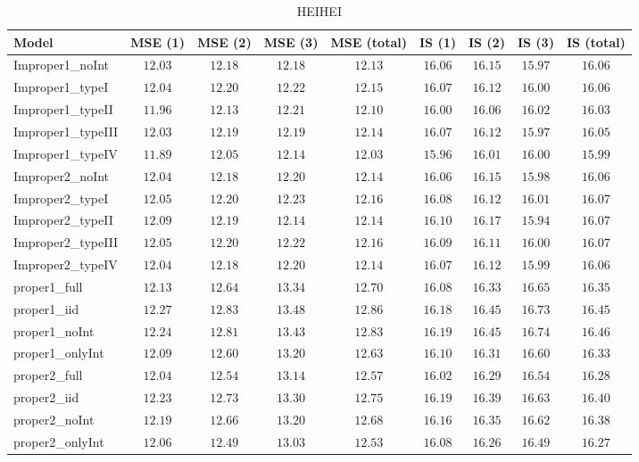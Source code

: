 \begin{table}

\caption{\label{tab:model-choice-sc6}HEIHEI}
\centering
\begin{tabular}{lcccccccc}
\hline
Model  & MSE (1) & MSE (2) & MSE (3) & MSE (total) & IS (1) & IS (2) & IS (3) & \multicolumn{1}{c}{IS (total)} \\ 
\hline
Improper1_noInt  & $12.03$ & $12.18$ & $12.18$ & $12.13$ & $16.06$ & $16.15$ & $15.97$ & $16.06$ \\
Improper1_typeI  & $12.04$ & $12.20$ & $12.22$ & $12.15$ & $16.07$ & $16.12$ & $16.00$ & $16.06$ \\
Improper1_typeII  & $11.96$ & $12.13$ & $12.21$ & $12.10$ & $16.00$ & $16.06$ & $16.02$ & $16.03$ \\
Improper1_typeIII  & $12.03$ & $12.19$ & $12.19$ & $12.14$ & $16.07$ & $16.12$ & $15.97$ & $16.05$ \\
Improper1_typeIV  & $11.89$ & $12.05$ & $12.14$ & $12.03$ & $15.96$ & $16.01$ & $16.00$ & $15.99$ \\
Improper2_noInt  & $12.04$ & $12.18$ & $12.20$ & $12.14$ & $16.06$ & $16.15$ & $15.98$ & $16.06$ \\
Improper2_typeI  & $12.05$ & $12.20$ & $12.23$ & $12.16$ & $16.08$ & $16.12$ & $16.01$ & $16.07$ \\
Improper2_typeII  & $12.09$ & $12.19$ & $12.14$ & $12.14$ & $16.10$ & $16.17$ & $15.94$ & $16.07$ \\
Improper2_typeIII  & $12.05$ & $12.20$ & $12.22$ & $12.16$ & $16.09$ & $16.11$ & $16.00$ & $16.07$ \\
Improper2_typeIV  & $12.04$ & $12.18$ & $12.20$ & $12.14$ & $16.07$ & $16.12$ & $15.99$ & $16.06$ \\
proper1_full  & $12.13$ & $12.64$ & $13.34$ & $12.70$ & $16.08$ & $16.33$ & $16.65$ & $16.35$ \\
proper1_iid  & $12.27$ & $12.83$ & $13.48$ & $12.86$ & $16.18$ & $16.45$ & $16.73$ & $16.45$ \\
proper1_noInt  & $12.24$ & $12.81$ & $13.43$ & $12.83$ & $16.19$ & $16.45$ & $16.74$ & $16.46$ \\
proper1_onlyInt  & $12.09$ & $12.60$ & $13.20$ & $12.63$ & $16.10$ & $16.31$ & $16.60$ & $16.33$ \\
proper2_full  & $12.04$ & $12.54$ & $13.14$ & $12.57$ & $16.02$ & $16.29$ & $16.54$ & $16.28$ \\
proper2_iid  & $12.23$ & $12.73$ & $13.30$ & $12.75$ & $16.19$ & $16.39$ & $16.63$ & $16.40$ \\
proper2_noInt  & $12.19$ & $12.66$ & $13.20$ & $12.68$ & $16.16$ & $16.35$ & $16.62$ & $16.38$ \\
proper2_onlyInt  & $12.06$ & $12.49$ & $13.03$ & $12.53$ & $16.08$ & $16.26$ & $16.49$ & $16.27$ \\
\hline 
\end{tabular}


\end{table}